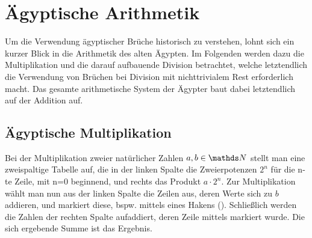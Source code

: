 \section{Ägyptische Arithmetik}
	Um die Verwendung ägyptischer Brüche historisch zu verstehen, lohnt sich ein kurzer Blick in die Arithmetik des alten Ägypten. Im Folgenden werden dazu die Multiplikation und die darauf aufbauende Division betrachtet, welche letztendlich die Verwendung von Brüchen bei Division mit nichttrivialem Rest erforderlich macht. Das gesamte arithmetische System der Ägypter baut dabei letztendlich auf der Addition auf.

\subsection{Ägyptische Multiplikation}\label{subsec:egypMult}
	Bei der Multiplikation zweier natürlicher Zahlen $a, b \in \N$ stellt man eine zweispaltige Tabelle auf, die in der linken Spalte die Zweierpotenzen $2^{n}$ für die n-te Zeile, mit n=0 beginnend, und rechts das Produkt $a \cdot 2^n$.
	Zur Multiplikation wählt man nun aus der linken Spalte die Zeilen aus, deren Werte sich zu $b$ addieren, und markiert diese, bspw. mittels eines Hakens (\checkmark). Schließlich werden die Zahlen der rechten Spalte aufaddiert, deren Zeile mittels \checkmark markiert wurde. Die sich ergebende Summe ist das Ergebnis.
	
